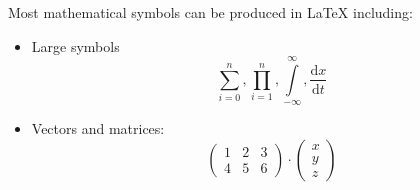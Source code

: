 Most mathematical symbols can be produced in \LaTeX{} including:
\begin{itemize}
\item Large symbols \[ \sum_{i=0}^{n}, \prod_{i=1}^{n}, \int\limits_{-\infty}^{\infty}, \frac{\mathrm{d}x}{\mathrm{d}t} \]
\item Vectors and matrices: \[ \begin{pmatrix} 1 & 2 & 3 \\ 4 & 5 & 6 \end{pmatrix} \cdot \begin{pmatrix} x \\ y \\ z \end{pmatrix} \]
\end{itemize}